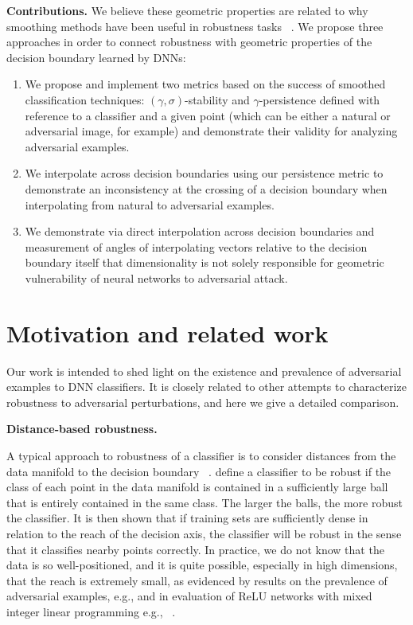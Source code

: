 {\bf Contributions.} We believe these geometric properties are related
to why smoothing methods have been useful in robustness tasks
~\citep{cohen2019certified, lecuyer2019certified, li2019certified}. We propose three approaches in order to connect robustness with geometric properties of the decision boundary learned by DNNs: 
\begin{enumerate}
    \item We propose and implement two metrics based on the success of smoothed classification techniques:  $(\gamma,\sigma)$-stability and $\gamma$-persistence defined with reference to a classifier and a given point (which can be either a natural or adversarial image, for example) and demonstrate their validity for analyzing adversarial examples. 
    \item We interpolate across decision boundaries using our persistence metric to demonstrate an inconsistency at the crossing of a decision boundary when interpolating from natural to adversarial examples.
    \item We demonstrate via direct interpolation across decision boundaries and measurement of angles of interpolating vectors relative to the decision boundary itself that dimensionality is not solely responsible for geometric vulnerability of neural networks to adversarial attack. 
\end{enumerate}

\section{Motivation and related work}

Our work is intended to shed light on the existence and prevalence of adversarial examples to DNN classifiers. It is closely related to other attempts to characterize robustness to adversarial perturbations, and here we give a detailed comparison.

{\bf Distance-based robustness.}

A typical approach to robustness of a classifier is to consider
distances from the data manifold to the decision boundary
~\citep{Wang2020Improving, xu2023exploring, he2018decision}.
\citet{khoury2018} define a classifier to be robust if the class of
each point in the data manifold is contained in a sufficiently large
ball that is entirely contained in the same class. The larger the
balls, the more robust the classifier. It is then shown that if
training sets are sufficiently dense in relation to the reach of the
decision axis, the classifier will be robust in the sense that it
classifies nearby points correctly. In practice, we do not know that
the data is so well-positioned, and it is quite possible, especially
in high dimensions, that the reach is extremely small, as evidenced by
results on the prevalence of adversarial examples, e.g.,
\citet{inevitable2018} and in evaluation of ReLU networks with mixed
integer linear programming e.g., ~\citet{tjeng2017evaluating}.


